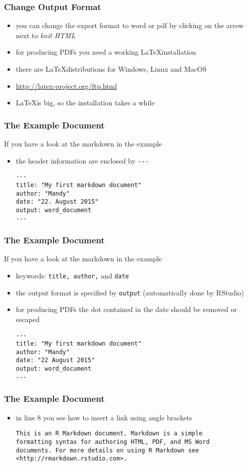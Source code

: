 \begin{frame}\frametitle{Change Output Format}
  \begin{itemize}
  \item you can change the export format to word or pdf by clicking on the arrow next to  \textit{knit HTML}
  \item for producing PDFs you need a working \LaTeX installation
  \item there are \LaTeX distributions for Windows, Linux and MacOS
  \item \url{http://latex-project.org/ftp.html}
  \item \LaTeX is big, so the installation takes a while
  \end{itemize}
\end{frame}

\begin{frame}[fragile]\frametitle{The Example Document}
  If you have a look at the markdown in the example
  \begin{itemize}
  \item the header information are enclosed by \verb|---|
\begin{verbatim}
---
title: "My first markdown document"
author: "Mandy"
date: "22. August 2015"
output: word_document
---
\end{verbatim}
  \end{itemize}
\end{frame}

\begin{frame}[fragile]\frametitle{The Example Document}
  If you have a look at the markdown in the example
  \begin{itemize}
\item keywords: \texttt{title, author,} and \texttt{date}
  \item the output format is specified by \texttt{output} (automatically done by RStudio)
  \item for producing PDFs the dot contained in the date should be removed or escaped
\begin{verbatim}
---
title: "My first markdown document"
author: "Mandy"
date: "22 August 2015"
output: word_document
---
\end{verbatim}

  \end{itemize}
\end{frame}



\begin{frame}[fragile]\frametitle{The Example Document}
  \begin{itemize}
  \item in line 8 you see how to insert a link using angle brackets\small
\begin{verbatim}
This is an R Markdown document. Markdown is a simple
formatting syntax for authoring HTML, PDF, and MS Word
documents. For more details on using R Markdown see
<http://rmarkdown.rstudio.com>.
\end{verbatim}
  \end{itemize}
\end{frame}


